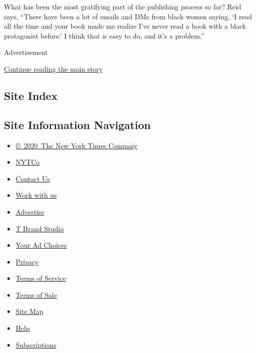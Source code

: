 What has been the most gratifying part of the publishing process so far?
Reid says, ``There have been a lot of emails and DMs from black women
saying, `I read all the time and your book made me realize I've never
read a book with a black protagonist before.' I think that is easy to
do, and it's a problem.''

Advertisement

\protect\hyperlink{after-bottom}{Continue reading the main story}

\hypertarget{site-index}{%
\subsection{Site Index}\label{site-index}}

\hypertarget{site-information-navigation}{%
\subsection{Site Information
Navigation}\label{site-information-navigation}}

\begin{itemize}
\tightlist
\item
  \href{https://help.nytimes3xbfgragh.onion/hc/en-us/articles/115014792127-Copyright-notice}{©~2020~The
  New York Times Company}
\end{itemize}

\begin{itemize}
\tightlist
\item
  \href{https://www.nytco.com/}{NYTCo}
\item
  \href{https://help.nytimes3xbfgragh.onion/hc/en-us/articles/115015385887-Contact-Us}{Contact
  Us}
\item
  \href{https://www.nytco.com/careers/}{Work with us}
\item
  \href{https://nytmediakit.com/}{Advertise}
\item
  \href{http://www.tbrandstudio.com/}{T Brand Studio}
\item
  \href{https://www.nytimes3xbfgragh.onion/privacy/cookie-policy\#how-do-i-manage-trackers}{Your
  Ad Choices}
\item
  \href{https://www.nytimes3xbfgragh.onion/privacy}{Privacy}
\item
  \href{https://help.nytimes3xbfgragh.onion/hc/en-us/articles/115014893428-Terms-of-service}{Terms
  of Service}
\item
  \href{https://help.nytimes3xbfgragh.onion/hc/en-us/articles/115014893968-Terms-of-sale}{Terms
  of Sale}
\item
  \href{https://spiderbites.nytimes3xbfgragh.onion}{Site Map}
\item
  \href{https://help.nytimes3xbfgragh.onion/hc/en-us}{Help}
\item
  \href{https://www.nytimes3xbfgragh.onion/subscription?campaignId=37WXW}{Subscriptions}
\end{itemize}

